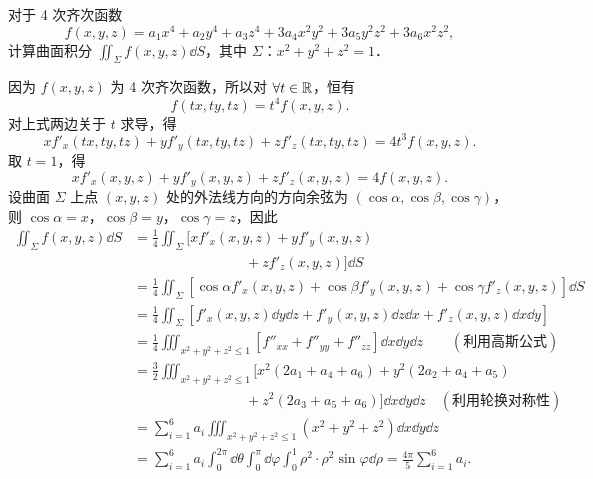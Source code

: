 对于 4 次齐次函数
\[
f(x,y,z)=a_{1}x^{4}+a_{2}y^{4}+a_{3}z^{4}+3a_{4}x^{2}y^{2}+3a_{5}y^{2}z^{2}+3a_{6}x^{2}z^{2},
\]
计算曲面积分 $\displaystyle\iint_{\Sigma}f(x,y,z)\dd S$，其中 $\Sigma$：$x^{2}+y^{2}+z^{2}=1$．
\begin{solution}
因为 $f(x,y,z)$ 为 4 次齐次函数，所以对 $\forall t\in\mathbb{R}$，恒有
\[
f(tx,ty,tz)=t^{4}f(x,y,z).
\]
对上式两边关于 $t$ 求导，得
\[
xf'_{x}(tx,ty,tz)+yf'_{y}(tx,ty,tz)+zf'_{z}(tx,ty,tz)=4t^{3}f(x,y,z).
\]
取 $t=1$，得
\[
xf'_{x}(x,y,z)+yf'_{y}(x,y,z)+zf'_{z}(x,y,z)=4f(x,y,z).
\]
设曲面 $\Sigma$ 上点 $(x,y,z)$ 处的外法线方向的方向余弦为 $(\cos\alpha,\cos\beta,\cos\gamma)$，则 $\cos\alpha=x$，$\cos\beta=y$，$\cos\gamma=z$，因此
\begin{align*}
\iint_{\Sigma}f(x,y,z)\dd S
&=\frac{1}{4}\iint_{\Sigma}\Big[xf'_{x}(x,y,z)+yf'_{y}(x,y,z)\\
&\qquad\qquad\qquad\qquad+zf'_{z}(x,y,z)\Big]\dd S\\
&=\frac{1}{4}\iint_{\Sigma}\left[\cos\alpha f'_{x}(x,y,z)+\cos\beta f'_{y}(x,y,z)+\cos\gamma f'_{z}(x,y,z)\right]\dd S\\
&=\frac{1}{4}\iint_{\Sigma}\left[f'_{x}(x,y,z)\dd y\dd z+f'_{y}(x,y,z)\dd z\dd x+f'_{z}(x,y,z)\dd x\dd y\right]\\
&=\frac{1}{4}\iiint_{x^{2}+y^{2}+z^{2}\le1}\left[f''_{xx}+f''_{yy}+f''_{zz}\right]\dd x\dd y\dd z\qquad(\text{利用高斯公式})\\
&=\frac{3}{2}\iiint_{x^{2}+y^{2}+z^{2}\le1}\Big[x^{2}(2a_{1}+a_{4}+a_{6})+y^{2}(2a_{2}+a_{4}+a_{5})\\
&\qquad\qquad\qquad\qquad+z^{2}(2a_{3}+a_{5}+a_{6})\Big]\dd x\dd y\dd z\quad(\text{利用轮换对称性})\\
&=\sum_{i=1}^{6}a_{i}\iiint_{x^{2}+y^{2}+z^{2}\le1}(x^{2}+y^{2}+z^{2})\dd x\dd y\dd z\\
&=\sum_{i=1}^{6}a_{i}\int_{0}^{2\pi}\dd\theta\int_{0}^{\pi}\dd\varphi\int_{0}^{1}\rho^{2}\cdot\rho^{2}\sin\varphi\dd\rho
=\frac{4\pi}{5}\sum_{i=1}^{6}a_{i}.
\end{align*}
\end{solution}

